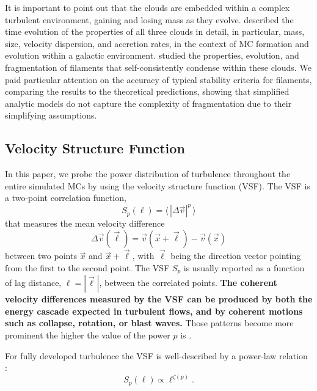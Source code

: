 It is important to point out that the clouds are embedded within a complex turbulent environment, gaining and losing mass as they evolve.
 described the time evolution of the properties of all three clouds in detail, in particular, mass, size, velocity dispersion, and accretion rates, in the context of MC formation and evolution within a galactic environment.
 studied the properties, evolution, and fragmentation of filaments that self-consistently condense within these clouds. 
We paid particular attention on the accuracy of typical stability criteria for filaments, comparing the results to the theoretical predictions, showing that simplified analytic models do not capture the complexity of fragmentation due to their simplifying assumptions.


\subsection{Velocity Structure Function}\label{methods:vsf}

In this paper, we probe the power distribution of turbulence throughout the entire simulated MCs by using the velocity structure function (VSF).
The VSF is a two-point correlation function,
\begin{equation}
	{S}_p (\ell) = \langle \, |\Delta \vec{v}|^p  \, \rangle
	\label{equ:method:def_vsf}
\end{equation}
that measures the mean velocity difference 
\begin{equation}
    \Delta \vec{v} (\vec{\ell}) = \vec{v}(\vec{x}+\vec{\ell}) - \vec{v}(\vec{x})
\end{equation} 
between two points $\vec{x}$ and $\vec{x}+\vec{\ell}$, with $\vec{\ell}$ being the direction vector pointing from the first to the second point.  The VSF
$S_p$ is usually reported as a function of lag distance, $\ell = |\vec{\ell}|$, between the correlated points.
\textbf{The coherent velocity differences measured by the VSF can be produced by both the energy cascade expected in turbulent flows, and by coherent motions such as collapse, rotation, or blast waves.}
Those patterns become more prominent the higher the value of the power $p$ is \citep{Heyer2004}.

For fully developed turbulence the VSF is well-described by a power-law relation \citep{Kolmogorov1941,She1994,Boldyrev2002}:
\begin{equation}
	\mathit{S}_p (\ell) \propto \ell^{\zeta(p)}.
	\label{equ:method:propto_zeta}
\end{equation}

